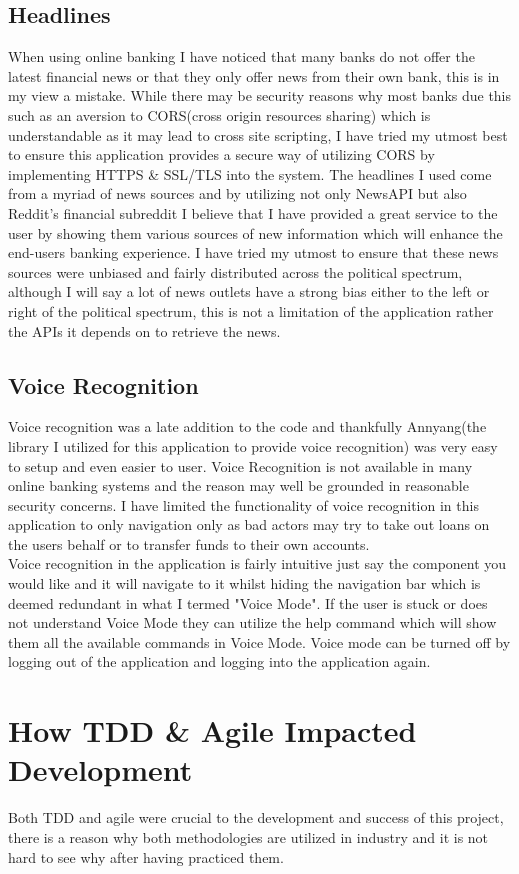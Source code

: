 \subsection{Headlines}
When using online banking I have noticed that many banks do not offer the latest financial news or that they only offer news from their own bank, this is in my view a mistake.  While there may be security reasons why most banks due this such as an aversion to CORS(cross origin resources sharing) which is understandable as it may lead to cross site scripting,  I have tried my utmost best to ensure this application provides a secure way of utilizing CORS by implementing HTTPS \& SSL/TLS into the system.  The headlines I used come from a myriad of news sources and by utilizing not only NewsAPI but also Reddit's financial subreddit I believe that I have provided a great service to the user by showing them various sources of new information which will enhance the end-users banking experience.  I have tried my utmost to ensure that these news sources were unbiased and fairly distributed across the political spectrum, although I will say a lot of news outlets have a strong bias either to the left or right of the political spectrum, this is not a limitation of the application rather the APIs it depends on to retrieve the news.
\subsection{Voice Recognition}
Voice recognition was a late addition to the code and thankfully Annyang(the library I utilized for this application to provide voice recognition)\cite{Annyang} was very easy to setup and even easier to user.  Voice Recognition is not available in many online banking systems and the reason may well be grounded in reasonable security concerns.  I have limited the functionality of voice recognition in this application to only navigation only as bad actors may try to take out loans on the users behalf or to transfer funds to their own accounts.
\\
Voice recognition in the application is fairly intuitive just say the component you would like and it will navigate to it whilst hiding the navigation bar which is deemed redundant in what I termed "Voice Mode".  If the user is stuck or does not understand Voice Mode they can utilize the help command which will show them all the available commands in Voice Mode. Voice mode can be turned off by logging out of the application and logging into the application again.
\section{How TDD \& Agile Impacted Development}
Both TDD and agile were crucial to the development and success of this project, there is a reason why both methodologies are utilized in industry and it is not hard to see why after having practiced them.

